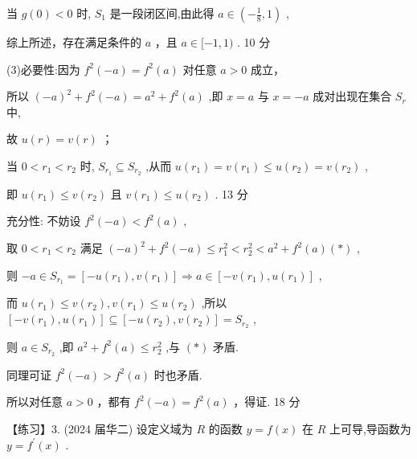\documentclass[10pt]{article}
\begin{document}
当 \(g\left( 0\right)  < 0\) 时, \({S}_{1}\) 是一段闭区间,由此得 \(a \in  \left( {-\frac{1}{8},1}\right)\) ,

综上所述，存在满足条件的 \(a\) ，且 \(a \in  \lbrack  - 1,1)\) . 10 分

(3)必要性:因为 \({f}^{2}\left( {-a}\right)  = {f}^{2}\left( a\right)\) 对任意 \(a > 0\) 成立，

所以 \({\left( -a\right) }^{2} + {f}^{2}\left( {-a}\right)  = {a}^{2} + {f}^{2}\left( a\right)\) ,即 \(x = a\) 与 \(x =  - a\) 成对出现在集合 \({S}_{r}\) 中,

故 \(u\left( r\right)  = v\left( r\right)\) ；

当 \(0 < {r}_{1} < {r}_{2}\) 时, \({S}_{{r}_{1}} \subseteq  {S}_{{r}_{2}}\) ,从而 \(u\left( {r}_{1}\right)  = v\left( {r}_{1}\right)  \leq  u\left( {r}_{2}\right)  = v\left( {r}_{2}\right)\) ,

即 \(u\left( {r}_{1}\right)  \leq  v\left( {r}_{2}\right)\) 且 \(v\left( {r}_{1}\right)  \leq  u\left( {r}_{2}\right)\) . 13 分

充分性: 不妨设 \({f}^{2}\left( {-a}\right)  < {f}^{2}\left( a\right)\) ,

取 \(0 < {r}_{1} < {r}_{2}\) 满足 \({\left( -a\right) }^{2} + {f}^{2}\left( {-a}\right)  \leq  {r}_{1}^{2} < {r}_{2}^{2} < {a}^{2} + {f}^{2}\left( a\right) \left( *\right)\) ,

则 \(- a \in  {S}_{{r}_{1}} = \left\lbrack  {-u\left( {r}_{1}\right) ,v\left( {r}_{1}\right) }\right\rbrack   \Rightarrow  a \in  \left\lbrack  {-v\left( {r}_{1}\right) ,u\left( {r}_{1}\right) }\right\rbrack\) ,

而 \(u\left( {r}_{1}\right)  \leq  v\left( {r}_{2}\right) ,v\left( {r}_{1}\right)  \leq  u\left( {r}_{2}\right)\) ,所以 \(\left\lbrack  {-v\left( {r}_{1}\right) ,u\left( {r}_{1}\right) }\right\rbrack   \subseteq  \left\lbrack  {-u\left( {r}_{2}\right) ,v\left( {r}_{2}\right) }\right\rbrack   = {S}_{{r}_{2}}\) ,

则 \(a \in  {S}_{{r}_{2}}\) ,即 \({a}^{2} + {f}^{2}\left( a\right)  \leq  {r}_{2}^{2}\) ,与 \(\left( *\right)\) 矛盾.

同理可证 \({f}^{2}\left( {-a}\right)  > {f}^{2}\left( a\right)\) 时也矛盾.

所以对任意 \(a > 0\) ，都有 \({f}^{2}\left( {-a}\right)  = {f}^{2}\left( a\right)\) ，得证. 18 分

【练习】3. (2024 届华二) 设定义域为 \(R\) 的函数 \(y = f\left( x\right)\) 在 \(R\) 上可导,导函数为 \(y = {f}^{\prime }\left( x\right)\) .
\end{document}
